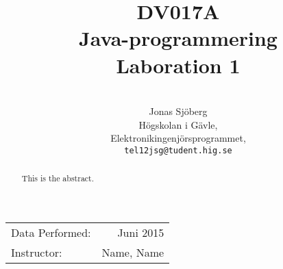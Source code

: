 \documentclass[11pt,a4paper]{article}
\title{DV017A \\ Java-programmering \\ Laboration 1}
\author{\\
  Jonas Sjöberg\\
  Högskolan i Gävle,\\
  Elektronikingenjörsprogrammet,\\
  \texttt{tel12jsg@tudent.hig.se}
}
\date{}
\begin{document}
    \maketitle

    \begin{center}
    \begin{tabular}{l r}
        Data Performed: & Juni 2015 \\
        Instructor: & Name, Name
    \end{tabular}
    \end{center}

    \begin{abstract}
        This is the abstract.
    \end{abstract}

    \newpage
    \setcounter{tocdepth}{3}
    \tableofcontents
    \newpage

%   
    
    
    
    
    
    
    
    
    
    
%   

    \newpage

    
\end{document}
